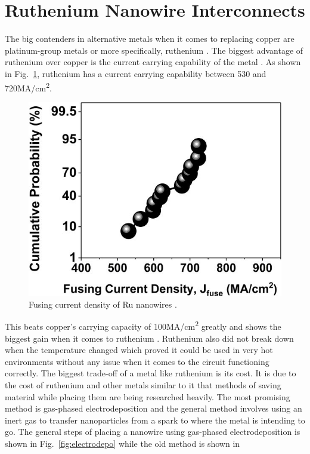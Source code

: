 \documentclass[conference]{IEEEtran}
\begin{document}
\section{Ruthenium Nanowire Interconnects}
The big contenders in alternative metals when it comes to replacing copper are platinum-group metals or more specifically,
ruthenium \cite{7968937}. The biggest advantage of ruthenium over copper is the current carrying capability of the metal \cite{7968937}.
As shown in Fig.~\ref{fig:curr_ruth}, ruthenium has a current carrying capability between 530 and 720MA/cm\textsuperscript{2}. 
\begin{figure}[!htb]
    \centering
    \includegraphics[width=\linewidth]{figures/curr_ruth.png}
    \caption{Fusing current density of Ru nanowires \cite{7968937}.}\label{fig:curr_ruth}
\end{figure}
This beats copper's carrying capacity of 100MA/cm\textsuperscript{2} greatly and shows the biggest gain when it comes to ruthenium
\cite{7968937}.
Ruthenium also did not break down when the temperature changed which proved it could be used in very hot environments without any issue
when it comes to the circuit functioning correctly.
The biggest trade-off of a metal like ruthenium is its cost. It is due to the cost of ruthenium and other metals similar to it that
methods of saving material while placing them are being researched heavily. The most promising method is gas-phased electrodeposition and
the general method involves using an inert gas to transfer nanoparticles from a spark to where the metal is intending to go. The general
steps of placing a nanowire using gas-phased electrodeposition is shown in Fig.~\ref{fig:electrodepo} while the old method is shown in
\end{document}
